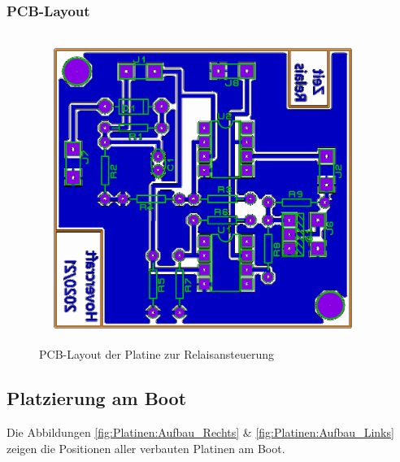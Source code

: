 \subsubsection{PCB-Layout}
\begin{figure}[h]
    \centering
    \includegraphics[width=0.95\textwidth]{../Proteus/Exports/Relaisansteuerung_PCB.png}
    \caption{PCB-Layout der Platine zur Relaisansteuerung}
\end{figure}
\newpage

\subsection{Platzierung am Boot}
Die Abbildungen \ref{fig:Platinen:Aufbau_Rechts} \& \ref{fig:Platinen:Aufbau_Links} zeigen die Positionen aller verbauten Platinen am Boot.\\


